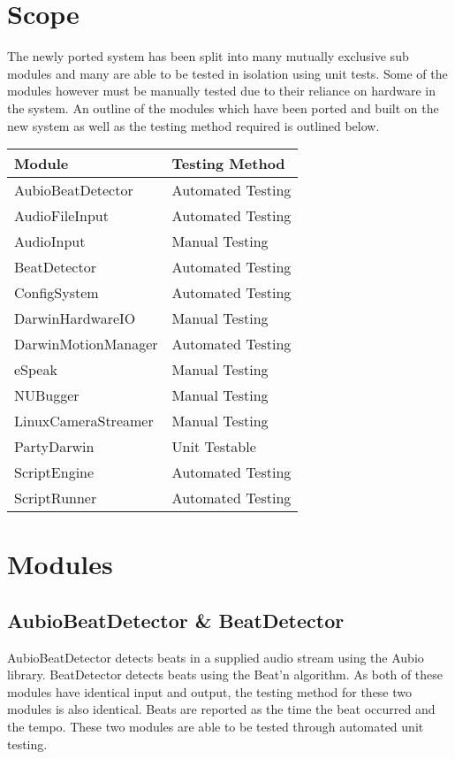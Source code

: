 \documentclass[english,12pt]{scrartcl}
\begin{document}
\section{Scope}
	The newly ported system has been split into many mutually exclusive sub modules and many are able to be tested in isolation using unit tests.
	Some of the modules however	must be manually tested due to their reliance on hardware in the system.
	An outline of the modules which have been ported and built on the new system as well as the testing method required is outlined below.
	\begin{tabular}{|p{7cm}|p{7cm}|}
		\hline \textbf{\large Module} & \textbf{\large Testing Method} \\ \hline
		AubioBeatDetector     & Automated Testing  \\ \hline
		AudioFileInput        & Automated Testing  \\ \hline
		AudioInput            & Manual Testing     \\ \hline
		BeatDetector          & Automated Testing  \\ \hline
		ConfigSystem          & Automated Testing  \\ \hline
		DarwinHardwareIO      & Manual Testing     \\ \hline
		DarwinMotionManager   & Automated Testing  \\ \hline
		eSpeak                & Manual Testing     \\ \hline
		NUBugger              & Manual Testing     \\ \hline
		LinuxCameraStreamer   & Manual Testing     \\ \hline
		PartyDarwin           & Unit Testable      \\ \hline
		ScriptEngine          & Automated Testing  \\ \hline
		ScriptRunner          & Automated Testing  \\ \hline
	\end{tabular}
	
\section{Modules}
	\subsection{AubioBeatDetector \& BeatDetector}
		AubioBeatDetector detects beats in a supplied audio stream using the Aubio library.
		BeatDetector detects beats using the Beat'n algorithm.
		As both of these modules have identical input and output, the testing method for these two modules is also identical.
		Beats are reported as the time the beat occurred and the tempo.
		These two modules are able to be tested through automated unit testing.
		
\end{document}
